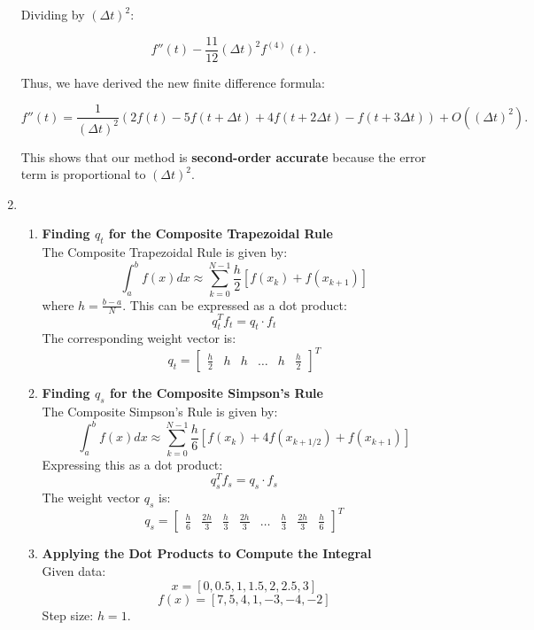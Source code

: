 \documentclass[12pt]{article}
\begin{document}
\begin{enumerate}
Dividing by $(\Delta t)^2$:

\begin{equation}
    f''(t) - \frac{11}{12} (\Delta t)^2 f^{(4)}(t).
\end{equation}

Thus, we have derived the new finite difference formula:

\begin{equation}
    f''(t) = \frac{1}{(\Delta t)^2} \left( 2f(t) - 5f(t+\Delta t) + 4f(t+2\Delta t) - f(t+3\Delta t) \right) + O((\Delta t)^2).
\end{equation}

This shows that our method is \textbf{second-order accurate} because the error term is proportional to $(\Delta t)^2$.


\item 
\begin{enumerate}
    \item \textbf{Finding \( q_t \) for the Composite Trapezoidal Rule} \\
    The Composite Trapezoidal Rule is given by:
    \[
    \int_a^b f(x)dx \approx \sum_{k=0}^{N-1} \frac{h}{2} \left[ f(x_k) + f(x_{k+1}) \right]
    \]
    where \( h = \frac{b-a}{N} \). This can be expressed as a dot product:
    \[
    q_t^T f_t = q_t \cdot f_t
    \]
    The corresponding weight vector is:
    \[
    q_t =
    \begin{bmatrix}
    \frac{h}{2} & h & h & \dots & h & \frac{h}{2}
    \end{bmatrix}^T
    \]

    \item \textbf{Finding \( q_s \) for the Composite Simpson’s Rule} \\
    The Composite Simpson’s Rule is given by:
    \[
    \int_a^b f(x)dx \approx \sum_{k=0}^{N-1} \frac{h}{6} \left[ f(x_k) + 4f(x_{k+1/2}) + f(x_{k+1}) \right]
    \]
    Expressing this as a dot product:
    \[
    q_s^T f_s = q_s \cdot f_s
    \]
    The weight vector \( q_s \) is:
    \[
    q_s =
    \begin{bmatrix}
    \frac{h}{6} & \frac{2h}{3} & \frac{h}{3} & \frac{2h}{3} & \dots & \frac{h}{3} & \frac{2h}{3} & \frac{h}{6}
    \end{bmatrix}^T
    \]

    \item \textbf{Applying the Dot Products to Compute the Integral} \\
    Given data:
    \[
    x = [0, 0.5, 1, 1.5, 2, 2.5, 3]
    \]
    \[
    f(x) = [7, 5, 4, 1, -3, -4, -2]
    \]
    Step size: \( h = 1 \).


\end{enumerate}
\end{enumerate}
\end{document}
